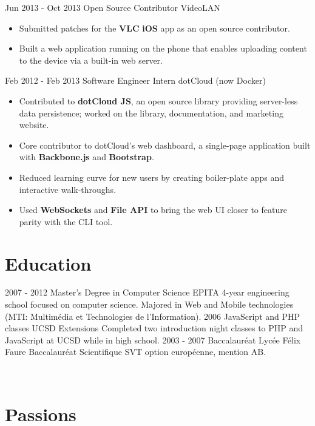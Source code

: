 \documentclass[]{friggeri-cv}
\begin{document}
\begin{entrylist}
    \entry
    {Jun 2013 - Oct 2013}
    {Open Source Contributor}
    {VideoLAN}
    {\begin{itemize}[nosep, leftmargin=1em, topsep=2pt]
        \item Submitted patches for the \textbf{VLC} \textbf{iOS} app as an open source contributor.
        \item Built a web application running on the phone that enables uploading content to the device via a built-in web server.
    \end{itemize}}

    \entry
    {Feb 2012 - Feb 2013}
    {Software Engineer Intern}
    {dotCloud (now Docker)}
    {\begin{itemize}[nosep, leftmargin=1em, topsep=2pt]
        \item Contributed to \textbf{dotCloud JS}, an open source library providing server-less data persistence; worked on the library, documentation, and marketing website.
        \item Core contributor to dotCloud's web dashboard, a single-page application built with \textbf{Backbone.js} and \textbf{Bootstrap}.
        \item Reduced learning curve for new users by creating boiler-plate apps and interactive walk-throughs.
        \item Used \textbf{WebSockets} and \textbf{File API} to bring the web UI closer to feature parity with the CLI tool.
    \end{itemize}}
\end{entrylist}

\section{Education}
\begin{entrylist}
  \entry
    {2007 - 2012}
    {Master's Degree in Computer Science}
    {EPITA}
    {4-year engineering school focused on computer science. Majored in Web and Mobile technologies (MTI: Multim\'{e}dia et Technologies de l'Information).}
  \entry
    {\phantom{2006 -} 2006}
    {JavaScript and PHP classes}
    {UCSD Extensions}
    {Completed two introduction night classes to PHP and JavaScript at UCSD while in high school.}
  \entry
    {2003 - 2007}
    {Baccalaur\'{e}at}
    {Lyc\'{e}e F\'{e}lix Faure}
    {Baccalaur\'{e}at Scientifique SVT option europ\'{e}enne, mention AB.}
\end{entrylist}

\begin{aside}
  ~
  ~
  ~
  ~
  ~
  ~
  ~
  ~
  ~
  ~
  \section{Passions}
  ~
    ~
\end{aside}
\end{document}
